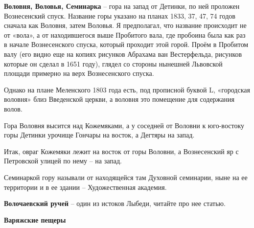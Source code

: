


 

\textbf{Воловня, Воловья, Семинарка} – гора на запад от Детинки, по ней проложен Вознесенский спуск. Название горы указано на планах 1833, 37, 47, 74 годов сначала как Воловня, затем Воловья. Я предполагал, что название происходит не от «вола», а от находившегося выше Пробитого вала, где пробоина была как раз в начале Вознесенского спуска, который проходит этой горой. Проём в Пробитом валу (его видно еще на копиях рисунков Абрахама ван Вестерфельда, рисунков которые он сделал в 1651 году), глядел со стороны нынешней Львовской площади примерно на верх Вознесенского спуска. 

Однако на плане Меленского 1803 года есть, под прописной буквой L, «городская воловня» близ Введенской церкви, а воловня это помещение для содержания волов. 

Гора Воловня высится над Кожемяками, а у соседней от Воловни к юго-востоку горы Детинки урочище Гончары на восток, а Дегтяры на запад. 

Итак, овраг Кожемяки лежит на восток от горы Воловни, а Вознесенский яр с Петровской улицей по нему – на запад.

Семинаркой гору называли от находящейся там Духовной семинарии, ныне на ее территории и в ее здании – Художественная академия.\\

\medskip

\textbf{Волочаевский ручей} – один из истоков Лыбеди, читайте про нее статью.\\



\medskip


\textbf{Варяжские пещеры}

